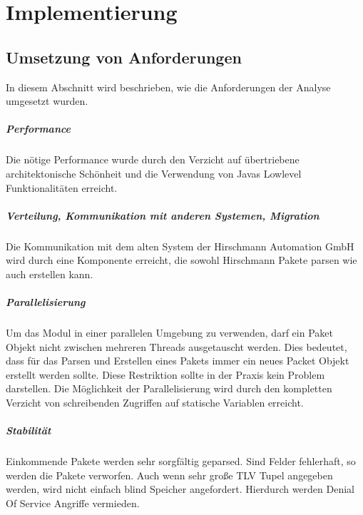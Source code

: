 \chapter{Implementierung}

\section{Umsetzung von Anforderungen}
In diesem Abschnitt wird beschrieben, wie die Anforderungen der Analyse umgesetzt wurden.

\paragraph{Performance}
Die nötige Performance wurde durch den Verzicht auf übertriebene architektonische 
Schönheit und die Verwendung von Javas Lowlevel Funktionalitäten erreicht.

\paragraph{Verteilung, Kommunikation mit anderen Systemen, Migration}
Die Kommunikation mit dem alten
System der Hirschmann Automation GmbH wird durch eine Komponente erreicht, die sowohl Hirschmann Pakete parsen wie auch erstellen kann.

\paragraph{Parallelisierung}
Um das Modul in einer parallelen Umgebung zu verwenden, darf ein Paket Objekt nicht
zwischen mehreren Threads ausgetauscht werden. Dies bedeutet, dass für das Parsen und 
Erstellen eines Pakets immer ein neues Packet Objekt erstellt werden sollte.
Diese Restriktion sollte in der Praxis kein Problem darstellen.
Die Möglichkeit der Parallelisierung wird durch den kompletten Verzicht von schreibenden Zugriffen auf statische Variablen erreicht.

\paragraph{Stabilität} Einkommende Pakete werden sehr sorgfältig geparsed.
Sind Felder fehlerhaft, so werden die Pakete verworfen. Auch wenn sehr große 
TLV Tupel angegeben werden, wird nicht einfach blind Speicher angefordert. Hierdurch
werden Denial Of Service Angriffe vermieden.

